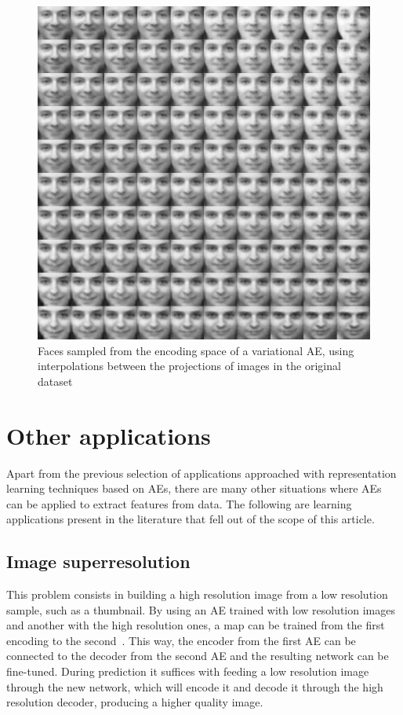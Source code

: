 \begin{figure}[ht!]
    \centering
    \includegraphics[width=\linewidth]{variational-matrix.png}
    \caption{\label{p5fig:sampledfaces}Faces sampled from the encoding space of a variational AE, using interpolations between the projections of images in the original dataset}
\end{figure}

\section{Other applications}\label{p5sec:oth}

Apart from the previous selection of applications approached with representation learning techniques based on AEs, there are many other situations where AEs can be applied to extract features from data. The following are learning applications present in the literature that fell out of the scope of this article.

\subsection{Image superresolution} This problem consists in building a high resolution image from a low resolution sample, such as a thumbnail. By using an AE trained with low resolution images and another with the high resolution ones, a map can be trained from the first encoding to the second~\cite{superresolution}. This way, the encoder from the first AE can be connected to the decoder from the second AE and the resulting network can be fine-tuned. During prediction it suffices with feeding a low resolution image through the new network, which will encode it and decode it through the high resolution decoder, producing a higher quality image.

